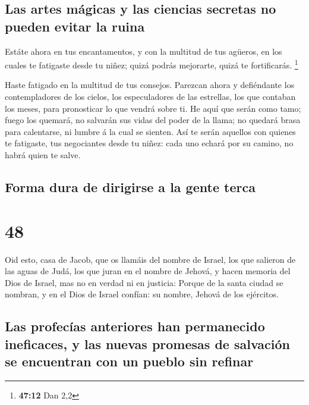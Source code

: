 \hypertarget{las-artes-muxe1gicas-y-las-ciencias-secretas-no-pueden-evitar-la-ruina}{%
\subsection{Las artes mágicas y las ciencias secretas no pueden evitar
la
ruina}\label{las-artes-muxe1gicas-y-las-ciencias-secretas-no-pueden-evitar-la-ruina}}

 Estáte ahora en tus encantamentos, y con la multitud de
tus agüeros, en los cuales te fatigaste desde tu niñez; quizá podrás
mejorarte, quizá te fortificarás. \footnote{\textbf{47:12} Dan 2,2}

 Haste fatigado en la multitud de tus consejos. Parezcan
ahora y defiéndante los contempladores de los cielos, los especuladores
de las estrellas, los que contaban los meses, para pronosticar lo que
vendrá sobre ti.  He aquí que serán como tamo; fuego los
quemará, no salvarán sus vidas del poder de la llama; no quedará brasa
para calentarse, ni lumbre á la cual se sienten.  Así te
serán aquellos con quienes te fatigaste, tus negociantes desde tu niñez:
cada uno echará por su camino, no habrá quien te salve.

\hypertarget{forma-dura-de-dirigirse-a-la-gente-terca}{%
\subsection{Forma dura de dirigirse a la gente
terca}\label{forma-dura-de-dirigirse-a-la-gente-terca}}

\hypertarget{section-47}{%
\section{48}\label{section-47}}

 Oid esto, casa de Jacob, que os llamáis del nombre de
Israel, los que salieron de las aguas de Judá, los que juran en el
nombre de Jehová, y hacen memoria del Dios de Israel, mas no en verdad
ni en justicia:  Porque de la santa ciudad se nombran, y en
el Dios de Israel confían: su nombre, Jehová de los ejércitos.

\hypertarget{las-profecuxedas-anteriores-han-permanecido-ineficaces-y-las-nuevas-promesas-de-salvaciuxf3n-se-encuentran-con-un-pueblo-sin-refinar}{%
\subsection{Las profecías anteriores han permanecido ineficaces, y las
nuevas promesas de salvación se encuentran con un pueblo sin
refinar}\label{las-profecuxedas-anteriores-han-permanecido-ineficaces-y-las-nuevas-promesas-de-salvaciuxf3n-se-encuentran-con-un-pueblo-sin-refinar}}

